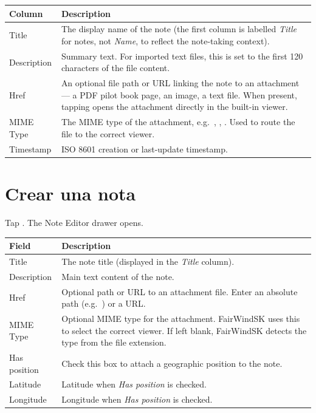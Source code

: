 \begin{longtable}{L{2.4cm} L{11.3cm}}
\toprule
{}
{\sffamily\bfseries\color{white} Column} &
{\sffamily\bfseries\color{white} Description} \\
\midrule
Title & The display name of the note (the first column is labelled \textit{Title} for notes, not \textit{Name}, to reflect the note-taking context). \\
Description & Summary text. For imported text files, this is set to the first 120 characters of the file content. \\
Href & An optional file path or URL linking the note to an attachment --- a PDF pilot book page, an image, a text file. When present, tapping  opens the attachment directly in the built-in viewer. \\
MIME Type & The MIME type of the attachment, e.g.\ , , . Used to route the file to the correct viewer. \\
Timestamp & ISO 8601 creation or last-update timestamp. \\
\bottomrule
\end{longtable}

\section{Crear una nota}

Tap . The Note Editor drawer opens.


\begin{longtable}{L{3cm} L{10.7cm}}
\toprule
{}
{\sffamily\bfseries\color{white} Field} &
{\sffamily\bfseries\color{white} Description} \\
\midrule
Title & The note title (displayed in the \textit{Title} column). \\
Description & Main text content of the note. \\
Href & Optional path or URL to an attachment file. Enter an absolute path (e.g.\ ) or a URL. \\
MIME Type & Optional MIME type for the attachment. FairWindSK uses this to select the correct viewer. If left blank, FairWindSK detects the type from the file extension. \\
Has position & Check this box to attach a geographic position to the note. \\
Latitude & Latitude when \textit{Has position} is checked. \\
Longitude & Longitude when \textit{Has position} is checked. \\
\bottomrule
\end{longtable}

